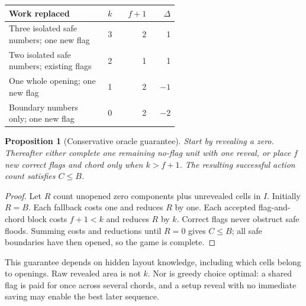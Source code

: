 \documentclass[11pt,letterpaper]{article}
\newtheorem{proposition}{Proposition}
\begin{document}
\begin{center}\small
\begin{tabular}{p{0.57\linewidth}rrr}
\toprule
Work replaced & $k$ & $f+1$ & $\Delta$\\
\midrule
Three isolated safe numbers; one new flag &3&2&1\\
Two isolated safe numbers; existing flags &2&1&1\\
One whole opening; one new flag &1&2&$-1$\\
Boundary numbers only; one new flag &0&2&$-2$\\
\bottomrule
\end{tabular}
\end{center}

\begin{proposition}[Conservative oracle guarantee]\label{prop:greedy}
Start by revealing a zero. Thereafter either complete one remaining no-flag unit with one reveal, or place $f$ new correct flags and chord only when $k>f+1$. The resulting successful action count satisfies $C\leq B$.
\end{proposition}
\begin{proof}
Let $R$ count unopened zero components plus unrevealed cells in $I$. Initially $R=B$. Each fallback costs one and reduces $R$ by one. Each accepted flag-and-chord block costs $f+1<k$ and reduces $R$ by $k$. Correct flags never obstruct safe floods. Summing costs and reductions until $R=0$ gives $C\leq B$; all safe boundaries have then opened, so the game is complete.
\end{proof}

This guarantee depends on hidden layout knowledge, including which cells belong to openings. Raw revealed area is not $k$. Nor is greedy choice optimal: a shared flag is paid for once across several chords, and a setup reveal with no immediate saving may enable the best later sequence.
\end{document}
